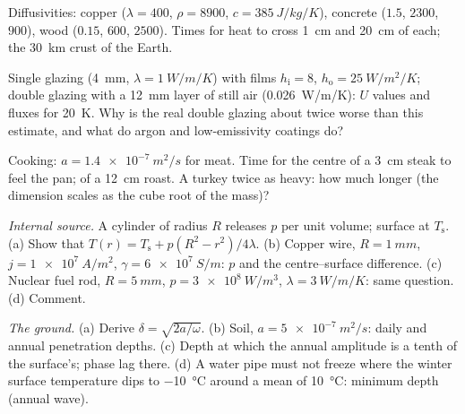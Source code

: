 \begin{exercise}[$\star$]\label{exo:b2:heat-conduction:2}
Diffusivities: copper ($\lambda = 400$, $\rho = 8900$, $c = \qty{385}{J/kg/K}$),
concrete ($1.5$, $2300$, $900$), wood ($0.15$, $600$, $2500$). Times for heat
to cross \qty{1}{cm} and \qty{20}{cm} of each; the \qty{30}{km} crust of
the Earth.
\end{exercise}

\begin{exercise}[$\star$]\label{exo:b2:heat-conduction:3}
Single glazing (\qty{4}{mm}, $\lambda = \qty{1}{W/m/K}$) with films $h_{\text{i}}
= 8$, $h_{\text{o}} = \qty{25}{W/m^2/K}$; double glazing with a \qty{12}{mm}
layer of still air (\qty{0.026}{W/m/K}): $U$ values and fluxes for
\qty{20}{K}. Why is the real double glazing about twice worse than this
estimate, and what do argon and low-emissivity coatings do?
\end{exercise}

\begin{exercise}[$\star$]\label{exo:b2:heat-conduction:4}
Cooking: $a = \qty{1.4e-7}{m^2/s}$ for meat. Time for the centre of a
\qty{3}{cm} steak to feel the pan; of a \qty{12}{cm} roast. A turkey
twice as heavy: how much longer (the dimension scales as the cube root
of the mass)?
\end{exercise}

\begin{exercise}[$\star\star$]\label{exo:b2:heat-conduction:5}
\emph{Internal source.} A cylinder of radius $R$ releases $p$ per unit
volume; surface at $T_{\text{s}}$. (a) Show that $T(r) = T_{\text{s}} +
p(R^2 - r^2)/4\lambda$. (b) Copper wire, $R = \qty{1}{mm}$, $j =
\qty{1e7}{A/m^2}$, $\gamma = \qty{6e7}{S/m}$: $p$ and the centre--surface
difference. (c) Nuclear fuel rod, $R = \qty{5}{mm}$, $p = \qty{3e8}{W/m^3}$,
$\lambda = \qty{3}{W/m/K}$: same question. (d) Comment.
\end{exercise}

\begin{exercise}[$\star\star$]\label{exo:b2:heat-conduction:6}
\emph{The ground.} (a) Derive $\delta = \sqrt{2a/\omega}$. (b) Soil,
$a = \qty{5e-7}{m^2/s}$: daily and annual penetration depths. (c) Depth
at which the annual amplitude is a tenth of the surface's; phase lag
there. (d) A water pipe must not freeze where the winter surface
temperature dips to \qty{-10}{\celsius} around a mean of
\qty{10}{\celsius}: minimum depth (annual wave).
\end{exercise}

